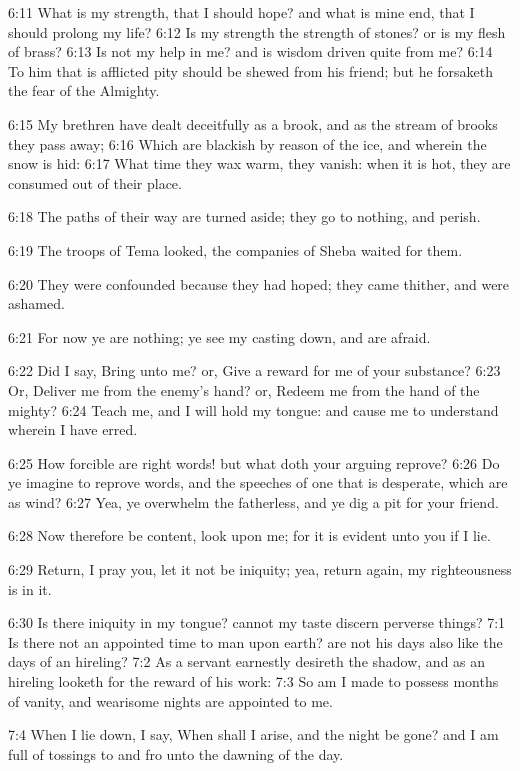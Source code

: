 6:11 What is my strength, that I should hope? and what is mine end,
that I should prolong my life?  6:12 Is my strength the strength of
stones? or is my flesh of brass?  6:13 Is not my help in me? and is
wisdom driven quite from me?  6:14 To him that is afflicted pity
should be shewed from his friend; but he forsaketh the fear of the
Almighty.

6:15 My brethren have dealt deceitfully as a brook, and as the stream
of brooks they pass away; 6:16 Which are blackish by reason of the
ice, and wherein the snow is hid: 6:17 What time they wax warm, they
vanish: when it is hot, they are consumed out of their place.

6:18 The paths of their way are turned aside; they go to nothing, and
perish.

6:19 The troops of Tema looked, the companies of Sheba waited for
them.

6:20 They were confounded because they had hoped; they came thither,
and were ashamed.

6:21 For now ye are nothing; ye see my casting down, and are afraid.

6:22 Did I say, Bring unto me? or, Give a reward for me of your
substance?  6:23 Or, Deliver me from the enemy's hand? or, Redeem me
from the hand of the mighty?  6:24 Teach me, and I will hold my
tongue: and cause me to understand wherein I have erred.

6:25 How forcible are right words! but what doth your arguing reprove?
6:26 Do ye imagine to reprove words, and the speeches of one that is
desperate, which are as wind?  6:27 Yea, ye overwhelm the fatherless,
and ye dig a pit for your friend.

6:28 Now therefore be content, look upon me; for it is evident unto
you if I lie.

6:29 Return, I pray you, let it not be iniquity; yea, return again, my
righteousness is in it.

6:30 Is there iniquity in my tongue? cannot my taste discern perverse
things?  7:1 Is there not an appointed time to man upon earth? are not
his days also like the days of an hireling?  7:2 As a servant
earnestly desireth the shadow, and as an hireling looketh for the
reward of his work: 7:3 So am I made to possess months of vanity, and
wearisome nights are appointed to me.

7:4 When I lie down, I say, When shall I arise, and the night be gone?
and I am full of tossings to and fro unto the dawning of the day.

